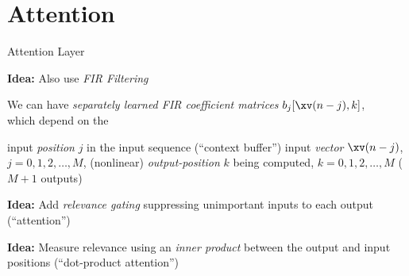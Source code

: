 \section[\sectopts,toc={Attention}]{Attention}

\begin{slide}[\slideopts,toc={Attention}]{Attention Layer}

\vspace{-1em}

\textbf{Idea:} Also use \emph{FIR Filtering}



\vspace{-1em}

We can have \emph{separately learned FIR coefficient matrices} $b_j[\xv(n-j),k]$, \\
  which depend on the
  \begin{enumerate}
    \mpitem input \emph{position} $j$ in the input sequence (``context buffer'')
    \mpitem input \emph{vector} $\xv(n-j)$, $j=0,1,2,\dots,M$, (nonlinear)
    \mpitem \emph{output-position} $k$ being computed, $k=0,1,2,\dots,M$ ($M+1$ outputs)
  \end{enumerate}

\maybepause
\textbf{Idea:} Add \emph{relevance gating} suppressing unimportant inputs to each output (``attention'')

\vspace{0.5em}

\maybepause
\textbf{Idea:} Measure relevance using an \emph{inner product} between the output and input positions (``dot-product attention'')
\end{slide}

